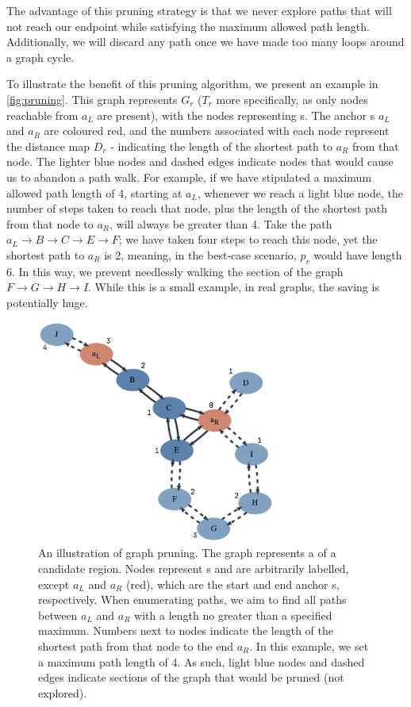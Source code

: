 The advantage of this pruning strategy is that we never explore paths that will not reach our endpoint while satisfying the maximum allowed path length. Additionally, we will discard any path once we have made too many loops around a graph cycle.

\noindent
To illustrate the benefit of this pruning algorithm, we present an example in \autoref{fig:pruning}. This graph represents $G_r$ ($T_r$ more specifically, as only nodes reachable from $a_L$ are present), with the nodes representing \kmer{}s. The anchor \kmer{}s $a_L$ and $a_R$ are coloured red, and the numbers associated with each node represent the distance map $D_r$ - indicating the length of the shortest path to $a_R$ from that node. The lighter blue nodes and dashed edges indicate nodes that would cause us to abandon a path walk. For example, if we have stipulated a maximum allowed path length of 4, starting at $a_L$, whenever we reach a light blue node, the number of steps taken to reach that node, plus the length of the shortest path from that node to $a_R$, will always be greater than 4. Take the path $a_L \rightarrow B \rightarrow C \rightarrow E \rightarrow F$; we have taken four steps to reach this node, yet the shortest path to $a_R$ is 2, meaning, in the best-case scenario, $p_r$ would have length 6. In this way, we prevent needlessly walking the section of the graph $F \rightarrow G \rightarrow H \rightarrow I$. While this is a small example, in real graphs, the saving is potentially huge.


\begin{figure}
    \centering
    \includegraphics[width=0.7\textwidth]{Chapter1/Figs/pruning.png}
    \caption{An illustration of graph pruning. The graph represents a \dbg{} of a candidate region. Nodes represent \kmer{}s and are arbitrarily labelled, except $a_L$ and $a_R$ (red), which are the start and end anchor \kmer{}s, respectively. When enumerating paths, we aim to find all paths between $a_L$ and $a_R$ with a length no greater than a specified maximum. Numbers next to nodes indicate the length of the shortest path from that node to the end \kmer{} $a_R$. In this example, we set a maximum path length of 4. As such, light blue nodes and dashed edges indicate sections of the graph that would be pruned (not explored).}
    \label{fig:pruning}
\end{figure}

